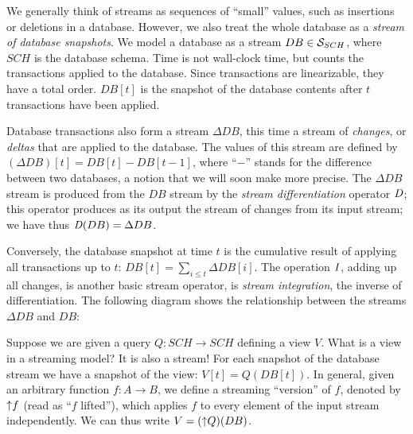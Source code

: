 \begin{center}
\end{center}

We generally think of streams as sequences of ``small'' values,
such as insertions or deletions in a database.
However, we also treat the whole database as a \emph{stream of database
snapshots}.  We model a database as a
stream $DB \in \mathcal{S}_{SCH}$, where $SCH$ is the database schema.
Time is not wall-clock time, but counts
the transactions applied to the database.
Since transactions are linearizable, they have a total order.
$DB[t]$ is the snapshot of the
database contents after $t$ transactions have been applied.

Database transactions also form a stream $\Delta DB$, this time a stream of \emph{changes},
or \emph{deltas} that are applied to the database.  The values of
this stream are defined by $(\Delta DB)[t] = DB[t] - DB[t-1]$, where ``$-$'' stands
for the difference between two databases, a notion that we will soon make more precise.
The $\Delta DB$ stream is produced from the $DB$ stream by
the \emph{stream differentiation} operator $\mathit{D}$;
this operator produces as its output the stream of changes from its input stream;
we have thus $\mathit{D}(DB) = \Delta DB$.

Conversely, the database snapshot at time $t$ is the cumulative result
of applying all transactions up to $t$: $DB[t] = \sum_{i \leq t}
\Delta DB[i]$.  The operation $\mathit{I}$, adding up all changes, is another
basic stream operator, is \emph{stream integration}, the inverse of
differentiation.  The following diagram shows the relationship
between the streams $\Delta DB$ and $DB$:
\begin{center}
\end{center}
Suppose we are given a query $Q : SCH \to SCH$ defining a view $V$.  What is
a view in a streaming model?  It is also a stream!  For each snapshot
of the database stream we have a snapshot of the view: $V[t] = Q(DB[t])$.
In general, given an arbitrary function $f: A \to B$, we define
a streaming ``version'' of $f$, denoted by ${\uparrow}f$
(read as ``$f$ lifted''), which applies
$f$ to every element of the input stream independently.
We can thus write $V = ({\uparrow}Q)(DB)$.

